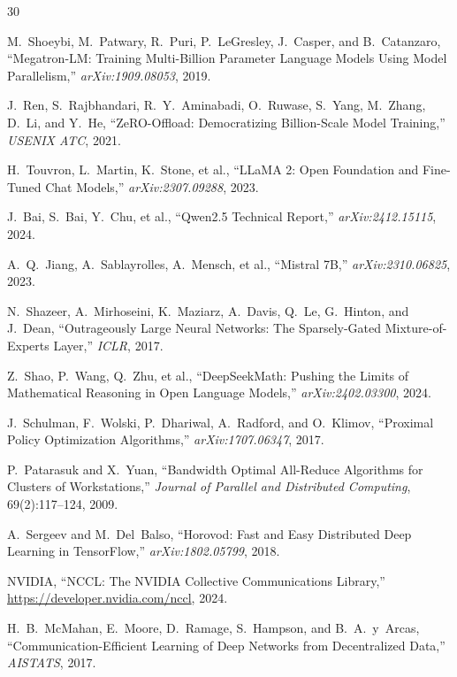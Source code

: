 \documentclass[11pt,letterpaper]{article}
\begin{document}

\begin{thebibliography}{30}

M.~Shoeybi, M.~Patwary, R.~Puri, P.~LeGresley, J.~Casper, and B.~Catanzaro, ``Megatron-LM: Training Multi-Billion Parameter Language Models Using Model Parallelism,'' \textit{arXiv:1909.08053}, 2019.

J.~Ren, S.~Rajbhandari, R.~Y.~Aminabadi, O.~Ruwase, S.~Yang, M.~Zhang, D.~Li, and Y.~He, ``ZeRO-Offload: Democratizing Billion-Scale Model Training,'' \textit{USENIX ATC}, 2021.

H.~Touvron, L.~Martin, K.~Stone, et al., ``LLaMA 2: Open Foundation and Fine-Tuned Chat Models,'' \textit{arXiv:2307.09288}, 2023.

J.~Bai, S.~Bai, Y.~Chu, et al., ``Qwen2.5 Technical Report,'' \textit{arXiv:2412.15115}, 2024.

A.~Q.~Jiang, A.~Sablayrolles, A.~Mensch, et al., ``Mistral 7B,'' \textit{arXiv:2310.06825}, 2023.

N.~Shazeer, A.~Mirhoseini, K.~Maziarz, A.~Davis, Q.~Le, G.~Hinton, and J.~Dean, ``Outrageously Large Neural Networks: The Sparsely-Gated Mixture-of-Experts Layer,'' \textit{ICLR}, 2017.

Z.~Shao, P.~Wang, Q.~Zhu, et al., ``DeepSeekMath: Pushing the Limits of Mathematical Reasoning in Open Language Models,'' \textit{arXiv:2402.03300}, 2024.

J.~Schulman, F.~Wolski, P.~Dhariwal, A.~Radford, and O.~Klimov, ``Proximal Policy Optimization Algorithms,'' \textit{arXiv:1707.06347}, 2017.

P.~Patarasuk and X.~Yuan, ``Bandwidth Optimal All-Reduce Algorithms for Clusters of Workstations,'' \textit{Journal of Parallel and Distributed Computing}, 69(2):117--124, 2009.

A.~Sergeev and M.~Del~Balso, ``Horovod: Fast and Easy Distributed Deep Learning in TensorFlow,'' \textit{arXiv:1802.05799}, 2018.

NVIDIA, ``NCCL: The NVIDIA Collective Communications Library,'' \url{https://developer.nvidia.com/nccl}, 2024.

H.~B.~McMahan, E.~Moore, D.~Ramage, S.~Hampson, and B.~A.~y~Arcas, ``Communication-Efficient Learning of Deep Networks from Decentralized Data,'' \textit{AISTATS}, 2017.


\end{thebibliography}
\end{document}
